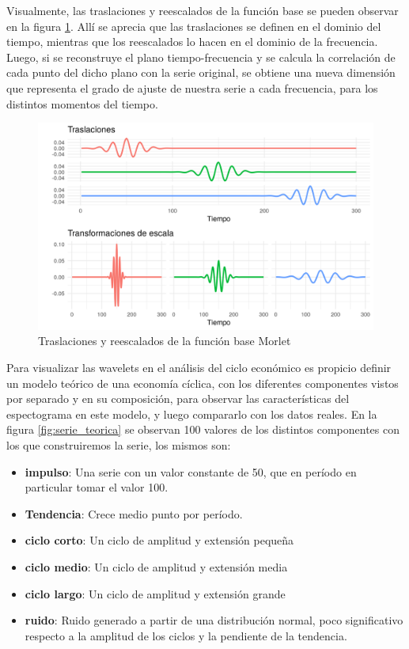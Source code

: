 \documentclass[a4paper]{article}
\begin{document}
Visualmente, las traslaciones y reescalados de la función base se pueden observar en la figura \ref{fig:morlet}. Allí se aprecia que las traslaciones se definen en el dominio del tiempo, mientras que los reescalados lo hacen en el dominio de la frecuencia. Luego, si se reconstruye el plano tiempo-frecuencia y se calcula la correlación de cada punto del dicho plano con la serie original, se obtiene una nueva dimensión que representa el grado de ajuste de nuestra serie a cada frecuencia, para los distintos momentos del tiempo. 

\begin{figure}[H]
	\centering
	\includegraphics[width=\linewidth]{morelt.png}
	\caption{Traslaciones y reescalados de la función base Morlet} \label{fig:morlet}
\end{figure}

Para visualizar las wavelets en el análisis del ciclo económico es propicio definir un modelo teórico de una economía cíclica, con los diferentes componentes vistos por separado y en su composición, para observar las características del espectograma en este modelo,  y luego compararlo con los datos reales. 
En la figura \ref{fig:serie_teorica} se observan 100 valores de los distintos componentes con los que construiremos la serie, los mismos son:

\begin{itemize}
	\item \textbf{impulso}: Una serie con un valor constante de 50, que en período en particular tomar el valor 100.
	\item \textbf{Tendencia}: Crece medio punto por período.
	\item \textbf{ciclo corto}: Un ciclo de amplitud y extensión pequeña
	\item \textbf{ciclo medio}: Un ciclo de amplitud y extensión media
	\item \textbf{ciclo largo}: Un ciclo de amplitud y extensión grande
	\item \textbf{ruido}: Ruido generado a partir de una distribución normal, poco significativo respecto a la amplitud de los ciclos y la pendiente de la tendencia.
\end{itemize}
\end{document}
